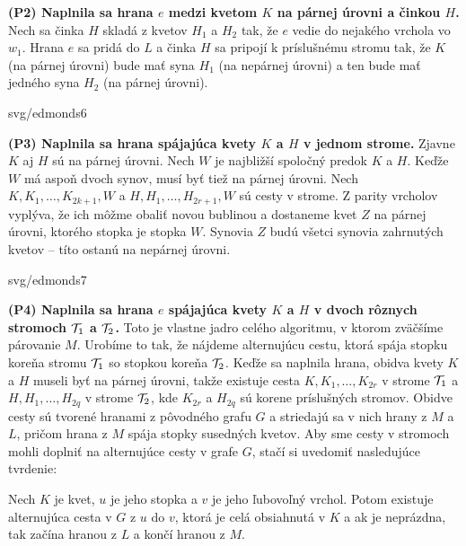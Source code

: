 \vspace*{-4ex}
\noindent
{\bf (P2) Naplnila sa hrana $e$ medzi kvetom $K$ na párnej úrovni a činkou $H$.} Nech sa činka $H$ skladá z 
kvetov $H_1$ a $H_2$ tak, že $e$ vedie do nejakého vrchola vo $w_1$. Hrana $e$ sa pridá do $L$ a
činka $H$ sa pripojí k príslušnému stromu tak, že $K$ (na párnej úrovni) bude mať syna $H_1$ (na nepárnej úrovni)
a ten bude mať jedného syna $H_2$ (na párnej úrovni).
\begin{myfig}{0.7\textwidth}{svg/edmonds6}
\end{myfig}

\vspace*{-4ex}
\noindent
{\bf (P3) Naplnila sa hrana spájajúca kvety $K$ a $H$ v jednom strome.} Zjavne $K$ aj $H$ sú na párnej úrovni.
Nech $W$ je najbližší spoločný predok $K$ a $H$. Keďže $W$ má aspoň dvoch synov, musí byť tiež na párnej úrovni.
Nech $K,K_1,\ldots,K_{2k+1},W$ a $H,H_1,\ldots,H_{2r+1},W$ sú cesty v strome. Z parity vrcholov vyplýva, že
ich môžme obaliť novou bublinou a dostaneme kvet $Z$ na párnej úrovni, ktorého stopka je stopka $W$. Synovia
$Z$ budú všetci synovia zahrnutých kvetov -- títo ostanú na nepárnej úrovni.
\begin{myfig}{0.8\textwidth}{svg/edmonds7}
\end{myfig}

\vspace*{-4ex}
\noindent
{\bf (P4) Naplnila sa hrana $e$ spájajúca kvety $K$ a $H$ v dvoch rôznych stromoch ${\cal T}_1$ a ${\cal T}_2$.} 
Toto je vlastne jadro celého algoritmu, v ktorom zväčšíme párovanie $M$. Urobíme to tak, že nájdeme 
alternujúcu cestu, ktorá spája stopku koreňa stromu ${\cal T}_1$ so stopkou koreňa ${\cal T}_2$.
Keďže sa naplnila hrana, obidva kvety $K$ a $H$ museli byť na párnej úrovni, takže existuje cesta
$K,K_1,\ldots,K_{2r}$ v strome ${\cal T}_1$ a $H,H_1,\ldots,H_{2q}$ v strome ${\cal T}_2$, kde $K_{2r}$ a $H_{2q}$ sú
korene príslušných stromov. Obidve cesty sú tvorené hranami z pôvodného grafu $G$
a striedajú sa v nich hrany z $M$ a $L$, pričom hrana z $M$ spája
stopky susedných kvetov. 
Aby sme cesty v stromoch  mohli doplniť na alternujúce 
cesty v grafe $G$, stačí si uvedomiť nasledujúce tvrdenie:

\begin{lema}
  \label{lm:1f:tmp1}
  Nech $K$ je kvet, $u$ je jeho stopka  a $v$ je jeho ľubovoľný vrchol. Potom 
  existuje alternujúca cesta v $G$ z $u$ do $v$, 
  ktorá je celá obsiahnutá v $K$ a ak je neprázdna, tak začína hranou z $L$ a končí hranou z $M$.
\end{lema}


